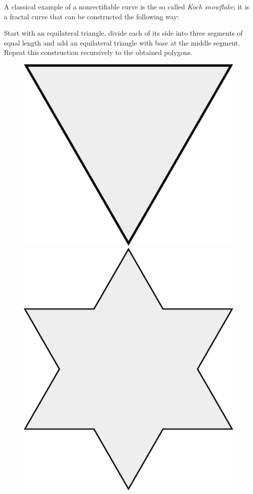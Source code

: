 A classical example of a nonrectifiable curve is the so called \emph{Koch snowflake};
it is a fractal curve that can be constructed the following way:

Start with an equilateral triangle, divide each of its side into three segments of equal length and add an equilateral triangle with base at the middle segment.
Repeat this construction recursively to the obtained polygons.
\begin{figure}[h!]
\begin{minipage}{.24\textwidth}
\centering
\vskip5.9mm
\includegraphics[scale=.15]{pics/Koch_Snowflake-0}
\end{minipage}
\hfill
\begin{minipage}{.24\textwidth}
\centering
\includegraphics[scale=.15]{pics/Koch_Snowflake-1}

\end{minipage}
\end{figure}
